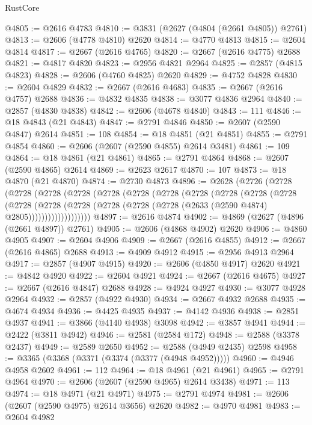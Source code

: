 \begin{lexlean}{RustCore}
\begin{coremodule}
@4805 := @2616 @4783
@4810 := @3831 (@2627 (@4804 (@2661 @4805)) @2761)
@4813 := @2606 (@4778 @4810) @2620
@4814 := @4770 @4813
@4815 := @2604 @4814
@4817 := @2667 (@2616 @4765)
@4820 := @2667 (@2616 @4775) @2688
@4821 := @4817 @4820
@4823 := @2956 @4821 @2964
@4825 := @2857 (@4815 @4823)
@4828 := @2606 (@4760 @4825) @2620
@4829 := @4752 @4828
@4830 := @2604 @4829
@4832 := @2667 (@2616 @4683)
@4835 := @2667 (@2616 @4757) @2688
@4836 := @4832 @4835
@4838 := @3077 @4836 @2964
@4840 := @2857 (@4830 @4838)
@4842 := @2606 (@4678 @4840)
@4843 := 111
@4846 := @18 @4843 (@21 @4843)
@4847 := @2791 @4846
@4850 := @2607 (@2590 @4847) @2614
@4851 := 108
@4854 := @18 @4851 (@21 @4851)
@4855 := @2791 @4854
@4860 := @2606 (@2607 (@2590 @4855) @2614 @3481)
@4861 := 109
@4864 := @18 @4861 (@21 @4861)
@4865 := @2791 @4864
@4868 := @2607 (@2590 @4865) @2614
@4869 := @2623 @2617
@4870 := 107
@4873 := @18 @4870 (@21 @4870)
@4874 := @2730 @4873
@4896 := @2628
    (@2726
      (@2728
        (@2728
          (@2728
            (@2728
              (@2728
                (@2728
                  (@2728
                    (@2728
                      (@2728
                        (@2728
                          (@2728
                            (@2728
                              (@2728
                                (@2728
                                  (@2728 (@2728 (@2728 (@2633 (@2590 @4874) @2805)))))))))))))))))))
@4897 := @2616 @4874
@4902 := @4869 (@2627 (@4896 (@2661 @4897)) @2761)
@4905 := @2606 (@4868 @4902) @2620
@4906 := @4860 @4905
@4907 := @2604 @4906
@4909 := @2667 (@2616 @4855)
@4912 := @2667 (@2616 @4865) @2688
@4913 := @4909 @4912
@4915 := @2956 @4913 @2964
@4917 := @2857 (@4907 @4915)
@4920 := @2606 (@4850 @4917) @2620
@4921 := @4842 @4920
@4922 := @2604 @4921
@4924 := @2667 (@2616 @4675)
@4927 := @2667 (@2616 @4847) @2688
@4928 := @4924 @4927
@4930 := @3077 @4928 @2964
@4932 := @2857 (@4922 @4930)
@4934 := @2667 @4932 @2688
@4935 := @4674 @4934
@4936 := @4425 @4935
@4937 := @4142 @4936
@4938 := @2851 @4937
@4941 := @3866 (@4140 @4938) @3098
@4942 := @3857 @4941
@4944 := @2422 (@3811 @4942)
@4946 := @2581 (@2584 @172)
@4948 := @2588 (@3378 @2437)
@4949 := @2589 @2650
@4952 := @2588 (@4949 @2435) @2598
@4958 := @3365 (@3368 (@3371 (@3374 (@3377 (@4948 @4952)))))
@4960 := @4946 @4958 @2602
@4961 := 112
@4964 := @18 @4961 (@21 @4961)
@4965 := @2791 @4964
@4970 := @2606 (@2607 (@2590 @4965) @2614 @3438)
@4971 := 113
@4974 := @18 @4971 (@21 @4971)
@4975 := @2791 @4974
@4981 := @2606 (@2607 (@2590 @4975) @2614 @3656) @2620
@4982 := @4970 @4981
@4983 := @2604 @4982

\end{coremodule}
\end{lexlean}
